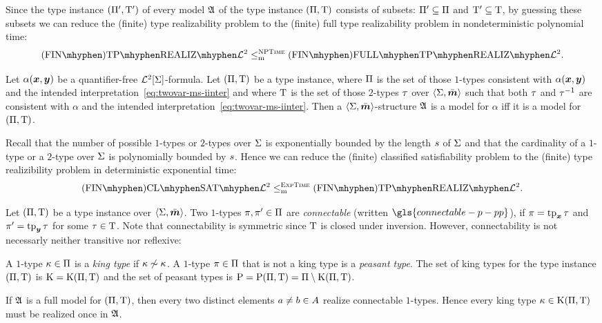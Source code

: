 \begin{remark}\label{rem:red-real-to-full-real}
Since the type instance $({\Pi'},{\mathrm{T}'})$ of every model $\mathfrak{A}$ of the type
instance $(\Pi,\mathrm{T})$ consists of subsets: ${\Pi'} \subseteq \Pi$ and
${\mathrm{T}'} \subseteq \mathrm{T}$, by guessing these subsets we can reduce the (finite)
type realizability problem to the (finite) full type realizability problem in
nondeterministic polynomial time:
\[
  \FinAReal{\vFo2} \red\cNP \FinAFullReal{\vFo2}.
\]
\end{remark}

\begin{remark}\label{rem:red-sat-to-real}
Let $\alpha(\bm{x},\bm{y})$ be a quantifier-free $\mathcal{L}^{2}[\mathrm{\Sigma}]$-formula.
Let $(\Pi,\mathrm{T})$ be a type instance, where $\Pi$ is the set of those
$1$-types consistent with $\alpha(\bm{x},\bm{y})$ and the intended
interpretation~\cref{eq:twovar-ms-iinter} and where $\mathrm{T}$ is the set of
those $2$-types $\tau$ over $\left\langle \mathrm{\Sigma},\bar{\bm{m}} \right\rangle$ such that both $\tau$ and 
$\tau^{-1}$ are consistent with $\alpha$ and the intended interpretation~\cref{eq:twovar-ms-iinter}. Then a $\left\langle \mathrm{\Sigma},\bar{\bm{m}} \right\rangle$-structure
$\mathfrak{A}$ is a model for $\alpha$ iff it is a model for $(\Pi,\mathrm{T})$.

Recall that the number of possible $1$-types or $2$-types over $\mathrm{\Sigma}$ is
exponentially bounded by the length $s$ of $\mathrm{\Sigma}$ and that the cardinality
of a $1$-type or a $2$-type over $\mathrm{\Sigma}$ is polynomially bounded by $s$.
Hence we can reduce the (finite) classified satisfiability problem to the
(finite) type realizibility problem in deterministic exponential time:
\[
  \FinAClSat{\vFo2} \red\cExpTime \FinAReal{\vFo2}.
\]
\end{remark}

\begin{definition}\label{def:connectable}
Let $(\Pi,\mathrm{T})$ be a type instance over $\left\langle \mathrm{\Sigma},\bar{\bm{m}} \right\rangle$.
Two $1$-types $\pi, {\pi'} \in \Pi$ are \emph{connectable} 
(written $\gls{connectable-p-pp}$), 
if $\pi = \operatorname{tp}_{\bm{x}}\tau$ and ${\pi'} = \operatorname{tp}_{\bm{y}}\tau$ for some $\tau \in \mathrm{T}$.
Note that connectability is symmetric since $\mathrm{T}$ is closed under inversion.
However, connectability is not necessarly neither transitive nor reflexive:

A $1$-type $\kappa \in \Pi$ is a \emph{king type} if $\kappa \not\sim \kappa$.
A $1$-type $\pi \in \Pi$ that is not a king type is a \emph{peasant type}.
The set of king types for the type instance $(\Pi,\mathrm{T})$ is
$\mathrm{K} = \mathrm{K}(\Pi,\mathrm{T})$ and the set of peasant types is
$\mathrm{P} = \mathrm{P}(\Pi,\mathrm{T}) = \Pi \setminus \mathrm{K}(\Pi,\mathrm{T})$.
\end{definition}
\begin{remark}\label{rem:twovar-king-once}
If $\mathfrak{A}$ is a full model for $(\Pi,\mathrm{T})$, then every two distinct
elements $a \neq b \in A$ realize connectable $1$-types. Hence every king type
$\kappa \in \mathrm{K}(\Pi,\mathrm{T})$ must be realized once in $\mathfrak{A}$.
\end{remark}

